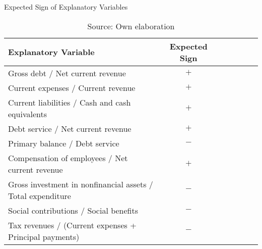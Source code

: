 \begin{table}[!ht] \centering 
  \caption{Expected Sign of Explanatory Variables} 
  \label{tbl:fares-general} 
{\renewcommand\arraystretch{1.25}}
\begin{tabular} {lcccccc}
\toprule

Explanatory Variable    & 
Expected Sign       \\ 

\hline

Gross debt / Net current revenue & 
$+$                              \\

\hline


Current expenses / Current revenue &  
$+$                                \\

\hline

Current liabilities / Cash and cash equivalents & 
$+$                                             \\

\hline

Debt service / Net current revenue &
$+$ \\

\hline

Primary balance / Debt service &
$-$ \\

\hline

Compensation of employees / Net current revenue &
$+$ \\

\hline

Gross investment in nonfinancial assets / Total expenditure &
$-$ \\

\hline

Social contributions / Social benefits &
$-$ \\

\hline

Tax revenues / (Current expenses + Principal payments) &
$-$ \\


\bottomrule
\end{tabular}%
\caption*{Source: Own elaboration}
\end{table} 

